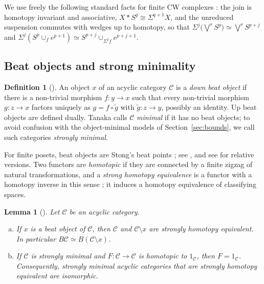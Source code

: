 \documentclass[12pt]{amsart}
\newtheorem{lemma}[teo]{Lemma}
\theoremstyle{definition}
\newtheorem{definition}[teo]{Definition}
\theoremstyle{remark}
\newcommand{\CC}{\mathcal{C}}
\newcommand{\co}{\colon}
\begin{document}
We use freely the following standard facts for finite CW complexes \cite{Hatcher2002}: the join is homotopy invariant and associative, $X*S^q\cong\Sigma^{q+1}X$, and the unreduced suspension commutes with wedges up to homotopy, so that $\Sigma^j\bigl(\bigvee^rS^p\bigr)\simeq\bigvee^rS^{p+j}$ and $\Sigma^j(S^p\cup_fe^{p+1})\simeq S^{p+j}\cup_{\Sigma^jf}e^{p+j+1}$.

\subsection{Beat objects and strong minimality}\label{subsec:beat}

\begin{definition}[{\cite[Definitions~2.3 and~2.10]{Tanaka2019}}]\label{def:beat}
An object $x$ of an acyclic category $\CC$ is a \emph{down beat object} if there is a non-trivial morphism $f\co y\to x$ such that every non-trivial morphism $g\co z\to x$ factors uniquely as $g=f\circ\tilde g$ with $\tilde g\co z\to y$, possibly an identity. Up beat objects are defined dually. Tanaka calls $\CC$ \emph{minimal} if it has no beat objects; to avoid confusion with the object-minimal models of Section~\ref{sec:bounds}, we call such categories \emph{strongly minimal}.
\end{definition}

For finite posets, beat objects are Stong's beat points \cite{Stong1966}; see \cite[Remark~2.4]{Tanaka2019}, and see \cite[Section~6]{CarcaciaCampos2026Bundles} for relative versions. Two functors are \emph{homotopic} if they are connected by a finite zigzag of natural transformations, and a \emph{strong homotopy equivalence} is a functor with a homotopy inverse in this sense \cite[Definition~2.2]{Tanaka2019}; it induces a homotopy equivalence of classifying spaces.

\begin{lemma}[{\cite[Corollary~2.7, Proposition~2.12]{Tanaka2019}}]\label{lem:tanaka}
Let $\CC$ be an acyclic category.
\begin{enumerate}[(a)]
\item If $x$ is a beat object of $\CC$, then $\CC$ and $\CC\setminus x$ are strongly homotopy equivalent. In particular $B\CC\simeq B(\CC\setminus x)$.
\item If $\CC$ is strongly minimal and $F\co\CC\to\CC$ is homotopic to $1_\CC$, then $F=1_\CC$. Consequently, strongly minimal acyclic categories that are strongly homotopy equivalent are isomorphic.
\end{enumerate}
\end{lemma}
\end{document}
